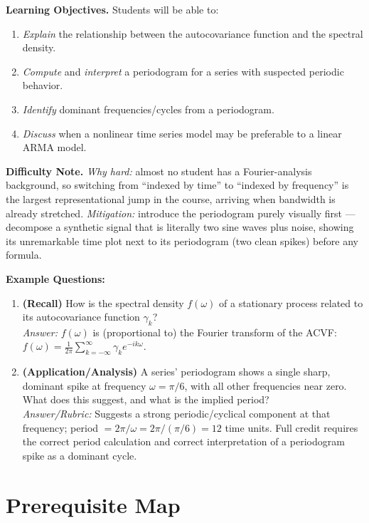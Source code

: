 \documentclass[11pt]{article}
\begin{document}
\textbf{Learning Objectives.} Students will be able to:
\begin{enumerate}
\item \emph{Explain} the relationship between the autocovariance function and the spectral density.
\item \emph{Compute} and \emph{interpret} a periodogram for a series with suspected periodic behavior.
\item \emph{Identify} dominant frequencies/cycles from a periodogram.
\item \emph{Discuss} when a nonlinear time series model may be preferable to a linear ARMA model.
\end{enumerate}

\textbf{Difficulty Note.} \emph{Why hard:} almost no student has a Fourier-analysis background, so switching from ``indexed by time'' to ``indexed by frequency'' is the largest representational jump in the course, arriving when bandwidth is already stretched. \emph{Mitigation:} introduce the periodogram purely visually first --- decompose a synthetic signal that is literally two sine waves plus noise, showing its unremarkable time plot next to its periodogram (two clean spikes) before any formula.

\textbf{Example Questions:}
\begin{enumerate}
\item \textbf{(Recall)} How is the spectral density $f(\omega)$ of a stationary process related to its autocovariance function $\gamma_k$? \\
\emph{Answer:} $f(\omega)$ is (proportional to) the Fourier transform of the ACVF: $f(\omega) = \frac{1}{2\pi}\sum_{k=-\infty}^{\infty} \gamma_k e^{-ik\omega}$.
\item \textbf{(Application/Analysis)} A series' periodogram shows a single sharp, dominant spike at frequency $\omega=\pi/6$, with all other frequencies near zero. What does this suggest, and what is the implied period? \\
\emph{Answer/Rubric:} Suggests a strong periodic/cyclical component at that frequency; period $= 2\pi/\omega = 2\pi/(\pi/6) = 12$ time units. Full credit requires the correct period calculation and correct interpretation of a periodogram spike as a dominant cycle.
\end{enumerate}

\section{Prerequisite Map}
\end{document}
